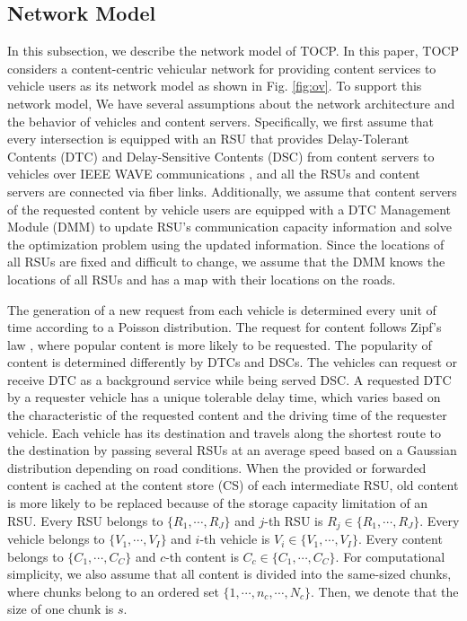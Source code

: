 \documentclass{ieeeaccess}
\begin{document}
\subsection{Network Model}
In this subsection, we describe the network model of TOCP.
In this paper, TOCP considers a content-centric vehicular network for providing content services to vehicle users as its network model as shown in Fig. \ref{fig:ov}.
To support this network model, We have several assumptions about the network architecture and the behavior of vehicles and content servers.
Specifically, we first assume that every intersection is equipped with an RSU that provides Delay-Tolerant Contents (DTC) and Delay-Sensitive Contents (DSC) from content servers to vehicles over IEEE WAVE communications \cite{WAVE}, and all the RSUs and content servers are connected via fiber links.
Additionally, we assume that content servers of the requested content by vehicle users are equipped with a DTC Management Module (DMM) to update RSU's communication capacity information and solve the optimization problem using the updated information.
Since the locations of all RSUs are fixed and difficult to change, we assume that the DMM knows the locations of all RSUs and has a map with their locations on the roads.

The generation of a new request from each vehicle is determined every unit of time according to a Poisson distribution.
The request for content follows Zipf's law \cite{Zipf}, where popular content is more likely to be requested.
The popularity of content is determined differently by DTCs and DSCs.
The vehicles can request or receive DTC as a background service while being served DSC.
A requested DTC by a requester vehicle has a unique tolerable delay time, which varies based on the characteristic of the requested content and the driving time of the requester vehicle.
Each vehicle has its destination and travels along the shortest route to the destination by passing several RSUs at an average speed based on a Gaussian distribution depending on road conditions.
When the provided or forwarded content is cached at the content store (CS) of each intermediate RSU, old content is more likely to be replaced because of the storage capacity limitation of an RSU.
Every RSU belongs to $\{R_{1}, \cdots, R_{J}\}$ and $j$-th RSU is $R_{j}\in\{R_{1}, \cdots, R_{J}\}$.
Every vehicle belongs to $\{V_{1}, \cdots, V_{I}\}$ and $i$-th vehicle is $V_{i}\in\{V_{1}, \cdots, V_{I}\}$.
Every content belongs to $\{C_{1}, \cdots, C_{C}\}$ and $c$-th content is $C_{c}\in\{C_{1}, \cdots, C_{C}\}$.
For computational simplicity, we also assume that all content is divided into the same-sized chunks, where chunks belong to an ordered set $\{1, \cdots, n_{c}, \cdots, N_{c}\}$.
Then, we denote that the size of one chunk is $s$.
\end{document}

